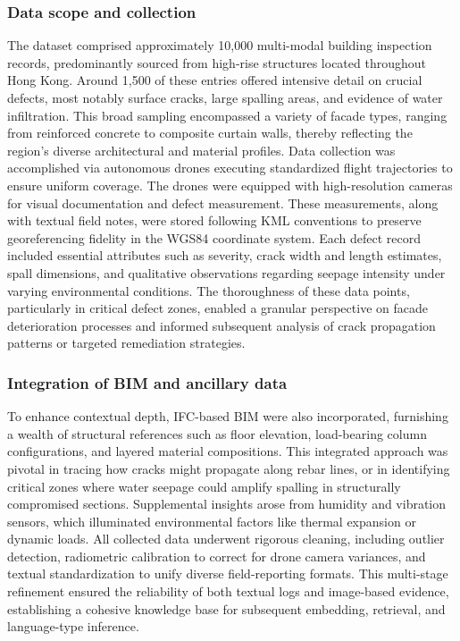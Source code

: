 \documentclass[a4paper,fleqn]{cas-sc}
\begin{document}
\subsubsection{Data scope and collection}

The dataset comprised approximately 10,000 multi-modal building inspection records, predominantly sourced from high-rise structures located throughout Hong Kong. Around 1,500 of these entries offered intensive detail on crucial defects, most notably surface cracks, large spalling areas, and evidence of water infiltration. This broad sampling encompassed a variety of facade types, ranging from reinforced concrete to composite curtain walls, thereby reflecting the region's diverse architectural and material profiles. Data collection was accomplished via autonomous drones executing standardized flight trajectories to ensure uniform coverage. The drones were equipped with high-resolution cameras for visual documentation and defect measurement. These measurements, along with textual field notes, were stored following KML conventions to preserve georeferencing fidelity in the WGS84 coordinate system. Each defect record included essential attributes such as severity, crack width and length estimates, spall dimensions, and qualitative observations regarding seepage intensity under varying environmental conditions. The thoroughness of these data points, particularly in critical defect zones, enabled a granular perspective on facade deterioration processes and informed subsequent analysis of crack propagation patterns or targeted remediation strategies.

\subsubsection{Integration of BIM and ancillary data}

To enhance contextual depth, IFC-based BIM were also incorporated, furnishing a wealth of structural references such as floor elevation, load-bearing column configurations, and layered material compositions. This integrated approach was pivotal in tracing how cracks might propagate along rebar lines, or in identifying critical zones where water seepage could amplify spalling in structurally compromised sections. Supplemental insights arose from humidity and vibration sensors, which illuminated environmental factors like thermal expansion or dynamic loads. All collected data underwent rigorous cleaning, including outlier detection, radiometric calibration to correct for drone camera variances, and textual standardization to unify diverse field-reporting formats. This multi-stage refinement ensured the reliability of both textual logs and image-based evidence, establishing a cohesive knowledge base for subsequent embedding, retrieval, and language-type inference.
\end{document}
